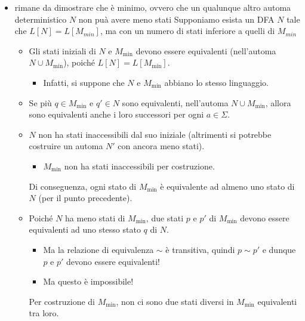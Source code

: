 {\begin{itemize}
        \item rimane da dimostrare che è minimo, ovvero che un qualunque altro automa deterministico $N$ non puà avere meno stati
        Supponiamo esista un DFA $N$ tale che $L[N]=L[M_{min}]$, ma con un numero di stati inferiore a quelli di $M_{min}$
        \begin{itemize}
            \item Gli stati iniziali di \( N \) e \( M_{\text{min}} \) devono essere equivalenti (nell'automa \( N \cup M_{\text{min}} \)), poiché \( L[N] = L[M_{\text{min}}] \).
                  \begin{itemize}
                      \item Infatti, si suppone che \( N \) e \( M_{\text{min}} \) abbiano lo stesso linguaggio.
                  \end{itemize}
        
            \item Se più \( q \in M_{\text{min}} \) e \( q' \in N \) sono equivalenti, nell'automa \( N \cup M_{\text{min}} \), allora sono equivalenti anche i loro successori per ogni \( a \in \Sigma \).
        
            \item \( N \) non ha stati inaccessibili dal suo iniziale (altrimenti si potrebbe costruire un automa \( N' \) con ancora meno stati). 
                  \begin{itemize}
                      \item \( M_{\text{min}} \) non ha stati inaccessibili per costruzione.
                  \end{itemize}
                  Di conseguenza, ogni stato di \( M_{\text{min}} \) è equivalente ad almeno uno stato di \( N \) (per il punto precedente).
        
            \item Poiché \( N \) ha meno stati di \( M_{\text{min}} \), due stati \( p \) e \( p' \) di \( M_{\text{min}} \) devono essere equivalenti ad uno stesso stato \( q \) di \( N \). 
                  \begin{itemize}
                      \item Ma la relazione di equivalenza \( \sim \) è transitiva, quindi \( p \sim p' \) e dunque \( p \) e \( p' \) devono essere equivalenti!
                      \item Ma questo è impossibile!
                  \end{itemize}
                  Per costruzione di \( M_{\text{min}} \), non ci sono due stati diversi in \( M_{\text{min}} \) equivalenti tra loro.
        \end{itemize}
    \end{itemize}
}


